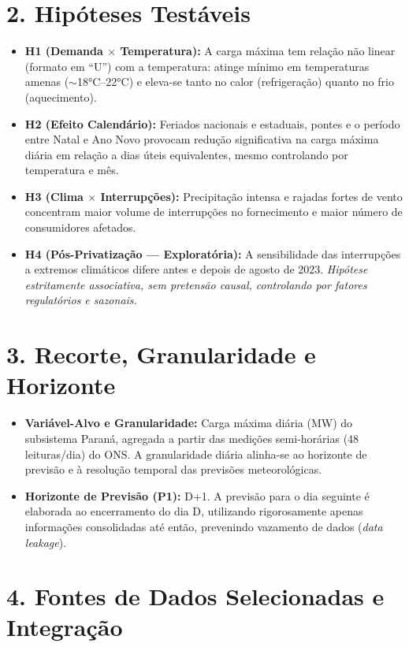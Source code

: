 \documentclass[
  a4paper,
  10pt,
  oneside,
  english,
  brazilian,
]{memoir}
\begin{document}
\section*{2. Hipóteses Testáveis}

\begin{itemize}[leftmargin=12pt, itemsep=-2pt, topsep=1pt]
  \item \textbf{H1 (Demanda $\times$ Temperatura):} A carga máxima tem relação não linear (formato em ``U'') com a temperatura: atinge mínimo em temperaturas amenas ($\sim$18°C--22°C) e eleva-se tanto no calor (refrigeração) quanto no frio (aquecimento).
  \item \textbf{H2 (Efeito Calendário):} Feriados nacionais e estaduais, pontes e o período entre Natal e Ano Novo provocam redução significativa na carga máxima diária em relação a dias úteis equivalentes, mesmo controlando por temperatura e mês.
  \item \textbf{H3 (Clima $\times$ Interrupções):} Precipitação intensa e rajadas fortes de vento concentram maior volume de interrupções no fornecimento e maior número de consumidores afetados.
  \item \textbf{H4 (Pós-Privatização --- Exploratória):} A sensibilidade das interrupções a extremos climáticos difere antes e depois de agosto de 2023. \textit{Hipótese estritamente associativa, sem pretensão causal, controlando por fatores regulatórios e sazonais.}
\end{itemize}

\section*{3. Recorte, Granularidade e Horizonte}

\begin{itemize}[leftmargin=12pt, itemsep=-2pt, topsep=1pt]
  \item \textbf{Variável-Alvo e Granularidade:} Carga máxima diária (MW) do subsistema Paraná, agregada a partir das medições semi-horárias (48 leituras/dia) do ONS. A granularidade diária alinha-se ao horizonte de previsão e à resolução temporal das previsões meteorológicas.
  \item \textbf{Horizonte de Previsão (P1):} D+1. A previsão para o dia seguinte é elaborada ao encerramento do dia D, utilizando rigorosamente apenas informações consolidadas até então, prevenindo vazamento de dados (\textit{data leakage}).
\end{itemize}

\section*{4. Fontes de Dados Selecionadas e Integração}
\end{document}
